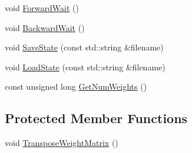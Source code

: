 \begin{DoxyCompactItemize}
\item 
void \hyperlink{classfractal_1_1Connection_a4ccde8145227156ce639a1c050ddb2a4}{Forward\+Wait} ()
\item 
void \hyperlink{classfractal_1_1Connection_aca0b898cc635378f3f246dfc6de384c6}{Backward\+Wait} ()
\item 
void \hyperlink{classfractal_1_1Connection_ae6c82dd4868442e324489ea88d12121d}{Save\+State} (const std\+::string \&filename)
\item 
void \hyperlink{classfractal_1_1Connection_a0539fa32a3eab1298eb7c373114fcc9e}{Load\+State} (const std\+::string \&filename)
\item 
const unsigned long \hyperlink{classfractal_1_1Connection_a8da7f0061214ed460eef30d18be2966d}{Get\+Num\+Weights} ()
\end{DoxyCompactItemize}
\subsection*{Protected Member Functions}
\begin{DoxyCompactItemize}
\item 
void \hyperlink{classfractal_1_1Connection_a9901894e4bd46fdcc7a8d8aa8c35b586}{Transpose\+Weight\+Matrix} ()
\end{DoxyCompactItemize}
